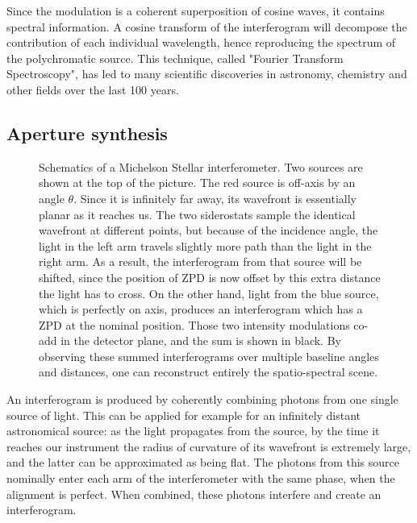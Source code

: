 Since the modulation is a coherent superposition of cosine waves, it contains spectral information. A cosine transform of the interferogram will decompose the contribution of each individual wavelength, hence reproducing the spectrum of the polychromatic source. This technique, called "Fourier Transform Spectroscopy", has led to many scientific discoveries in astronomy, chemistry and other fields over the last 100 years.

\subsection{Aperture synthesis}


\begin{figure}[!h]
	\centering
	
	\caption[Michelson Stellar interferometer]{Schematics of a Michelson Stellar interferometer. Two sources are shown at the top of the picture. The red source is off-axis by an angle $\theta$. Since it is infinitely far away, its wavefront is essentially planar as it reaches us. The two siderostats sample the identical wavefront at different points, but because of the incidence angle, the light in the left arm travels slightly more path than the light in the right arm. As a result, the interferogram from that source will be shifted, since the position of ZPD is now offset by this extra distance the light has to cross. On the other hand, light from the blue source, which is perfectly on axis, produces an interferogram which has a ZPD at the nominal position. Those two intensity modulations co-add in the detector plane, and the sum is shown in black. By observing these summed interferograms over multiple baseline angles and distances, one can reconstruct entirely the spatio-spectral scene.}
	\label{fig:interferometer}
    \end{figure}


An interferogram is produced by coherently combining photons from one single source of light. This can be applied for example for an infinitely distant astronomical source: as the light propagates from the source, by the time it reaches our instrument the radius of curvature of its wavefront is extremely large, and the latter can be approximated as being flat. The photons from this source nominally enter each arm of the interferometer with the same phase, when the alignment is perfect. When combined, these photons interfere and create an interferogram.

